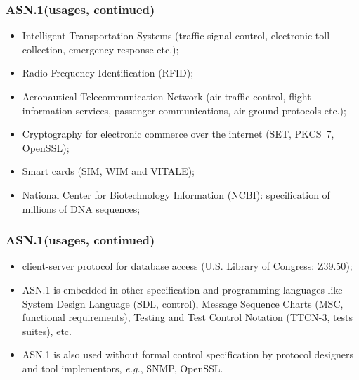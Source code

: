 \documentclass[compress,dvips,xcolor={dvipsnames},t]{beamer}
\newcommand\ASN{\textsf{ASN.1}\xspace}
\begin{document}

\begin{frame}
\frametitle{\ASN (usages, continued)}

\begin{itemize}

  \item Intelligent Transportation Systems (traffic signal
  control, electronic toll collection, emergency response etc.);

  \item Radio Frequency Identification (RFID);

  \item Aeronautical Telecommunication Network (air traffic control,
    flight information services, passenger communications, air-ground
    protocols etc.);

  \item Cryptography for electronic commerce over the internet (SET,
    PKCS~7, OpenSSL);

  \item Smart cards (SIM, WIM and VITALE);

  \item National Center for Biotechnology Information (NCBI):
    specification of millions of DNA sequences;

\end{itemize}

\end{frame}


\begin{frame}
\frametitle{\ASN (usages, continued)}

  \begin{itemize}

  \item client-server protocol for database access (U.S. Library of
    Congress: \textsf{Z39.50});

  \item \ASN is embedded in other specification and programming
    languages like System Design Language (SDL, control), Message
    Sequence Charts (MSC, functional requirements), Testing and Test
    Control Notation (TTCN-3, tests suites), etc.

  \item \ASN is also used without formal control specification by
    protocol designers and tool implementors, \emph{e.g.}, SNMP,
    OpenSSL.

\end{itemize}

\end{frame}
\end{document}
